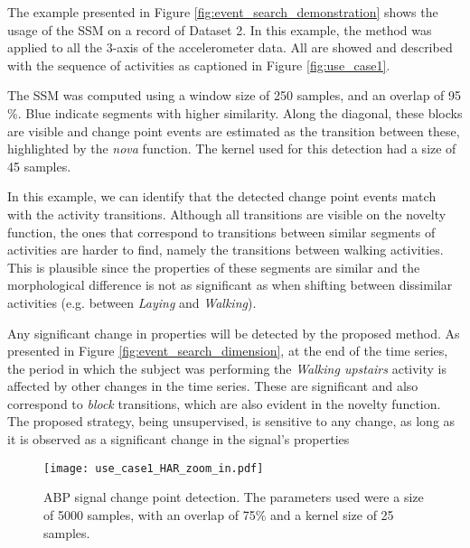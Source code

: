 {The example presented in Figure \ref{fig:event_search_demonstration} shows the usage of the \gls{SSM} on a record of Dataset 2. In this example, the method was applied to all the 3-axis of the accelerometer data. All are showed and described with the sequence of activities as captioned in Figure \ref{fig:use_case1}.
\par
The \gls{SSM} was computed using a window size of 250 samples, and an overlap of 95 \%. Blue indicate segments with higher similarity. Along the diagonal, these blocks are visible and change point events are estimated as the transition between these, highlighted by the \textit{nova} function. The kernel used for this detection had a size of 45 samples.
\par
In this example, we can identify that the detected change point events match with the activity transitions. Although all transitions are visible on the novelty function, the ones that correspond to transitions between similar segments of activities are harder to find, namely the transitions between walking activities. This is plausible since the properties of these segments are similar and the morphological difference is not as significant as when shifting between dissimilar activities (e.g. between \textit{Laying} and \textit{Walking}).
\par
Any significant change in properties will be detected by the proposed method. As presented in Figure \ref{fig:event_search_dimension}, at the end of the time series, the period in which the subject was performing the \textit{Walking upstairs} activity is affected by other changes in the time series. These are significant and also correspond to \textit{block} transitions, which are also evident in the novelty function. The proposed strategy, being unsupervised, is sensitive to any change, as long as it is observed as a significant change in the signal's properties\\


\begin{figure}
    \centering
    \texttt{[image: use\_case1\_HAR\_zoom\_in.pdf]}
    \caption{ABP signal change point detection. The parameters used were a size of 5000 samples, with an overlap of 75\% and a kernel size of 25 samples.}
    \label{fig:example1_zoom}
\end{figure}

}
